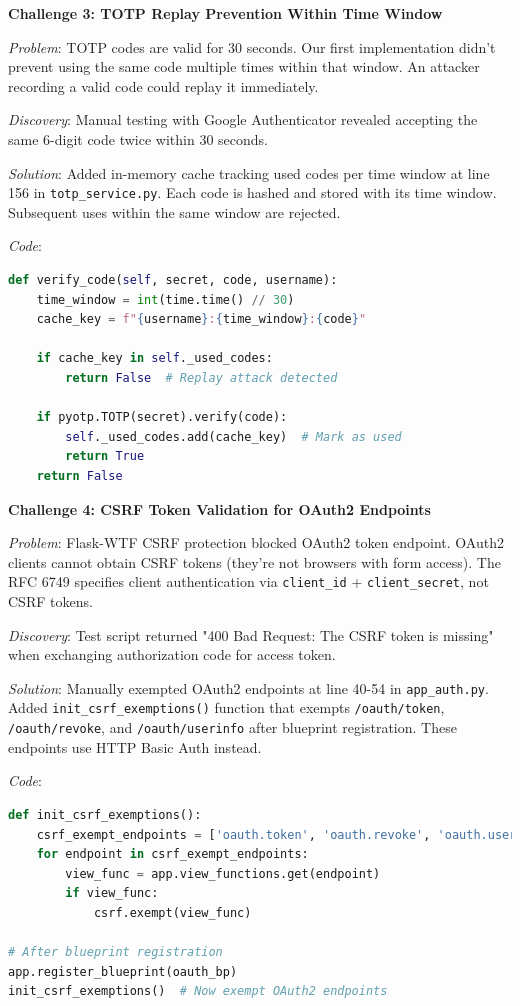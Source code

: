 \documentclass[12pt,a4paper]{article}
\begin{document}
\textbf{Challenge 3: TOTP Replay Prevention Within Time Window}

\textit{Problem}: TOTP codes are valid for 30 seconds. Our first implementation didn't prevent using the same code multiple times within that window. An attacker recording a valid code could replay it immediately.

\textit{Discovery}: Manual testing with Google Authenticator revealed accepting the same 6-digit code twice within 30 seconds.

\textit{Solution}: Added in-memory cache tracking used codes per time window at line 156 in \texttt{totp\_service.py}. Each code is hashed and stored with its time window. Subsequent uses within the same window are rejected.

\textit{Code}:
\begin{lstlisting}[language=Python]
def verify_code(self, secret, code, username):
    time_window = int(time.time() // 30)
    cache_key = f"{username}:{time_window}:{code}"

    if cache_key in self._used_codes:
        return False  # Replay attack detected

    if pyotp.TOTP(secret).verify(code):
        self._used_codes.add(cache_key)  # Mark as used
        return True
    return False
\end{lstlisting}

\textbf{Challenge 4: CSRF Token Validation for OAuth2 Endpoints}

\textit{Problem}: Flask-WTF CSRF protection blocked OAuth2 token endpoint. OAuth2 clients cannot obtain CSRF tokens (they're not browsers with form access). The RFC 6749 specifies client authentication via \texttt{client\_id} + \texttt{client\_secret}, not CSRF tokens.

\textit{Discovery}: Test script returned "400 Bad Request: The CSRF token is missing" when exchanging authorization code for access token.

\textit{Solution}: Manually exempted OAuth2 endpoints at line 40-54 in \texttt{app\_auth.py}. Added \texttt{init\_csrf\_exemptions()} function that exempts \texttt{/oauth/token}, \texttt{/oauth/revoke}, and \texttt{/oauth/userinfo} after blueprint registration. These endpoints use HTTP Basic Auth instead.

\textit{Code}:
\begin{lstlisting}[language=Python]
def init_csrf_exemptions():
    csrf_exempt_endpoints = ['oauth.token', 'oauth.revoke', 'oauth.userinfo']
    for endpoint in csrf_exempt_endpoints:
        view_func = app.view_functions.get(endpoint)
        if view_func:
            csrf.exempt(view_func)

# After blueprint registration
app.register_blueprint(oauth_bp)
init_csrf_exemptions()  # Now exempt OAuth2 endpoints
\end{lstlisting}
\end{document}

